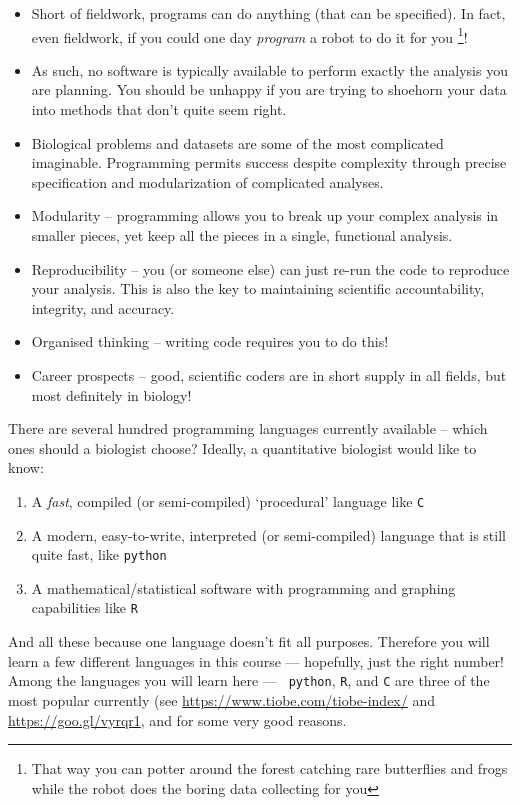 \begin{itemize} \itemsep0pt
	\item Short of fieldwork, programs can do anything (that can be 
	specified). In fact, even fieldwork, if you could one day {\it 
	program} a robot to do it for you \footnote{That way you can potter around
	the forest catching rare butterflies and frogs while the robot does the boring 
	data collecting for you}!  

	\item As such, no software is typically available to perform exactly 
	the analysis you are planning. You should be unhappy if you are 
	trying to shoehorn your data into methods that don't quite seem 
	right.
	
	\item Biological problems and datasets are some of the most 
	complicated imaginable. Programming permits success despite 
	complexity through precise specification	and modularization of 
	complicated analyses. 
	
	\item Modularity -- programming allows you to break up your complex 
	analysis in smaller pieces, yet keep all the pieces in a single, 
	functional analysis.
	 
	\item Reproducibility -- you (or someone else) can just re-run the 
	code to reproduce your analysis. This is also the key to maintaining 
	scientific accountability, integrity, and accuracy.

	\item Organised thinking -- writing code requires you to do this!
	
	\item Career prospects -- good, scientific coders are in short supply 
	in all fields, but most definitely in biology!
	
\end{itemize}

There are several hundred programming languages currently available -- 
which ones should a biologist choose? Ideally, a quantitative biologist 
would like to know:
\begin{enumerate}
	\item A {\it fast}, compiled (or semi-compiled) `procedural' language 
	like {\tt C}
	\item A modern, easy-to-write, interpreted (or semi-compiled) 
	language that is still quite fast, like {\tt python}
	\item A mathematical/statistical software with programming and 
	graphing capabilities like {\tt R}
\end{enumerate}
And all these because one language doesn't fit all purposes. Therefore you 
will learn a few different languages in this course --- hopefully, just 
the right number! Among the languages you will learn here --- {\tt 
python}, 
{\tt R}, and {\tt C} are three of the most popular currently (see
\url{https://www.tiobe.com/tiobe-index/} and \url{ https://goo.gl/vyrqr1}, 
and for some very good reasons.

